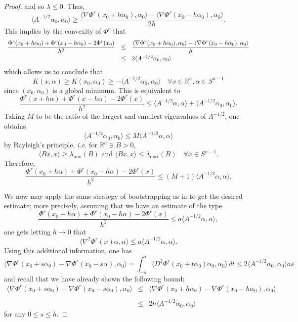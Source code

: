 \documentclass[11pt,a4paper,reqno]{amsart}
\numberwithin{equation}{section}
\theoremstyle{definition}
\newcommand{\nm}{\noalign{\smallskip}}
\newcommand{\ds}{\displaystyle}
\newcommand{\<}{\ensuremath \leq}
\renewcommand{\>}{\ensuremath \geq}
\begin{document}
\begin{proof}
    and so $\lambda \leq 0.$ Thus, $$\langle A^{-1/2}\alpha_0,\alpha_0\rangle \geq \frac{\langle \nabla \Phi^r(x_0+h\alpha_0),\alpha_0\rangle-\langle \nabla \Phi^r(x_0-h\alpha_0),\alpha_0\rangle}{2h}.$$ This implies by the convexity of $\Phi^r$ that $$\begin{array}{lll}
    \ds \frac{\Phi^r(x_0+h\alpha_0)+\Phi^r(x_0-h\alpha_0)-2\Phi^r(x_0)}{h^2} &\leq& \ds \frac{\langle \nabla \Phi^r(x_0+h\alpha_0), \alpha_0\rangle-\langle \nabla \Phi^r(x_0-h\alpha_0),\alpha_0\rangle}{h} \\
    \nm 
    &\leq& 2\langle A^{-1/2}\alpha_0,\alpha_0\rangle\end{array}$$ which allows us to conclude that $$K(x,\alpha) \geq K(x_0,\alpha_0) \geq -\langle A^{-1/2}\alpha_0,\alpha_0\rangle \quad \forall x \in \mathbb{R}^n, \alpha \in S^{n-1}$$ since $(x_0,\alpha_0)$ is a global minimum. This is equivalent to $$\frac{\Phi^r(x+h\alpha)+\Phi^r(x-h\alpha)-2\Phi^r(x)}{h^2} \leq \langle A^{-1/2}\alpha, \alpha \rangle+\langle A^{-1/2}\alpha_0,\alpha_0\rangle.$$ Taking $M$ to be the ratio of the largest and smallest eigenvalues of $A^{-1/2}$, one obtains $$\langle A^{-1/2}\alpha_0,\alpha_0\rangle \leq M\langle A^{-1/2}\alpha,\alpha\rangle$$ by Rayleigh's principle, \textit{i.e.} for $\mathbb{R}^n \ni B>0$, $$\langle Bx,x\rangle \geq \lambda_{\min}(B) \text{ and } \langle Bx,x\rangle \leq \lambda_{\max}(B) \quad \forall x \in S^{n-1}.$$ Therefore, $$\frac{\Phi^r(x_0+h\alpha)+\Phi^r(x_0-h\alpha)-2\Phi^r(x)}{h^2} \leq (M+1)\langle A^{-1/2}\alpha,\alpha\rangle.$$ 

    
    We now may apply the same strategy of bootstrapping as in \cite{Kolesnikov,Vald1} to get the desired estimate; more precisely, assuming that we have an estimate of the type $$\frac{\Phi^r(x_0+h\alpha)+\Phi^r(x_0-h\alpha)-2\Phi^r(x)}{h^2} \le a \langle A^{-1/2}\alpha,\alpha\rangle,$$ one gets letting $h \rightarrow 0$ that $$\langle \nabla^2 \Phi^r(x)\alpha, \alpha \rangle \le a\langle A^{-1/2}\alpha,\alpha \rangle.$$ Using this additional information, one has $$\langle \nabla \Phi^r(x_0+s\alpha_0)-\nabla \Phi^r(x_0-s\alpha),\alpha_0\rangle=\int_{-s}^s \langle D^2\Phi^r(x_0+t\alpha_0)\alpha_0,\alpha_0\rangle \, dt \le 2\langle A^{-1/2}\alpha_0,\alpha_0\rangle as$$ and recall that we have already shown the following bound: $$\begin{array}{lll}
    \ds \langle \nabla \Phi^r(x_0+s\alpha_0)-\nabla \Phi^r(x_0-s\alpha_0),\alpha_0\rangle &\le& \ds \langle \nabla \Phi^r(x_0+h\alpha_0)-\nabla \Phi^r(x_0-h\alpha_0),\alpha_0\rangle \\ \\
     &\le& \ds 2h\langle A^{-1/2}\alpha_0,\alpha_0\rangle
    \end{array}$$ for any $0 \le s \le h.$ 
    

\end{proof}
\end{document}
